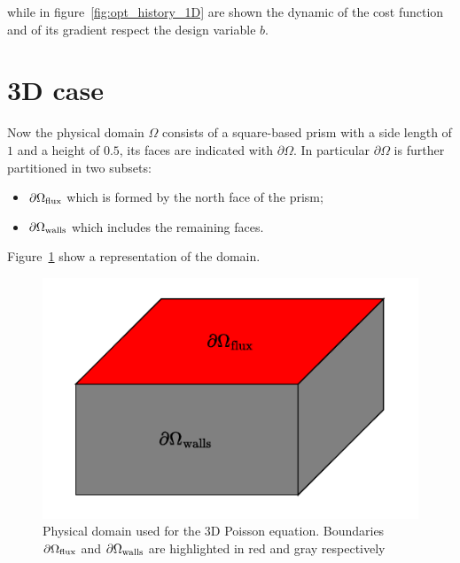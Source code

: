 while in figure~\ref{fig:opt_history_1D} are shown the dynamic of the cost function and of its gradient respect the design variable $b$.




\section{3D case}
\label{sec:results_3D_case}

Now the physical domain $\Omega$ consists of a square-based prism with a side length of $1$ and a height of $0.5$, its faces are indicated with $\partial\Omega$. In particular $\partial\Omega$ is further partitioned in two subsets:
\begin{itemize}
	\item $\partial\Omega_\textup{flux}$ which is formed by the north face of the prism;
	\item $\partial\Omega_\textup{walls}$ which includes the remaining faces.
\end{itemize}
Figure~\ref{fig:3D_prism-shaped_domain} show a representation of the domain.

\begin{figure}[htp]
	\centering
	\includegraphics[width=.5\textwidth]{img/3D_prism-shaped_domain}
	\caption{Physical domain used for the $3$D Poisson equation. Boundaries $\partial\Omega_\textup{flux}$ and $\partial\Omega_\textup{walls}$ are highlighted in red and gray respectively}
	\label{fig:3D_prism-shaped_domain}
\end{figure}


